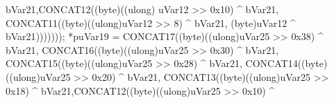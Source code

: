 \documentclass[
]{article}
\newenvironment{Shaded}{}{}
\newcommand{\BaseNTok}[1]{\textcolor[rgb]{0.25,0.63,0.44}{#1}}
\newcommand{\DecValTok}[1]{\textcolor[rgb]{0.25,0.63,0.44}{#1}}
\newcommand{\ExtensionTok}[1]{#1}
\newcommand{\NormalTok}[1]{#1}
\newcommand{\OperatorTok}[1]{\textcolor[rgb]{0.40,0.40,0.40}{#1}}
\begin{document}
\begin{Shaded}
\begin{Highlighting}[]
\NormalTok{                                                                  bVar21}\OperatorTok{,}\NormalTok{CONCAT12}\OperatorTok{((}\NormalTok{byte}\OperatorTok{)((}\ExtensionTok{ulong}\OperatorTok{)}
\NormalTok{                                                  uVar12 }\OperatorTok{\textgreater{}\textgreater{}} \BaseNTok{0x10}\OperatorTok{)} \OperatorTok{\^{}}\NormalTok{ bVar21}\OperatorTok{,}
\NormalTok{                                                  CONCAT11}\OperatorTok{((}\NormalTok{byte}\OperatorTok{)((}\ExtensionTok{ulong}\OperatorTok{)}\NormalTok{uVar12 }\OperatorTok{\textgreater{}\textgreater{}} \DecValTok{8}\OperatorTok{)} \OperatorTok{\^{}}\NormalTok{ bVar21}\OperatorTok{,}
                                                           \OperatorTok{(}\NormalTok{byte}\OperatorTok{)}\NormalTok{uVar12 }\OperatorTok{\^{}}\NormalTok{ bVar21}\OperatorTok{)))))));}
        \OperatorTok{*}\NormalTok{puVar19 }\OperatorTok{=}\NormalTok{ CONCAT17}\OperatorTok{((}\NormalTok{byte}\OperatorTok{)((}\ExtensionTok{ulong}\OperatorTok{)}\NormalTok{uVar25 }\OperatorTok{\textgreater{}\textgreater{}} \BaseNTok{0x38}\OperatorTok{)} \OperatorTok{\^{}}\NormalTok{ bVar21}\OperatorTok{,}
\NormalTok{                            CONCAT16}\OperatorTok{((}\NormalTok{byte}\OperatorTok{)((}\ExtensionTok{ulong}\OperatorTok{)}\NormalTok{uVar25 }\OperatorTok{\textgreater{}\textgreater{}} \BaseNTok{0x30}\OperatorTok{)} \OperatorTok{\^{}}\NormalTok{ bVar21}\OperatorTok{,}
\NormalTok{                                     CONCAT15}\OperatorTok{((}\NormalTok{byte}\OperatorTok{)((}\ExtensionTok{ulong}\OperatorTok{)}\NormalTok{uVar25 }\OperatorTok{\textgreater{}\textgreater{}} \BaseNTok{0x28}\OperatorTok{)} \OperatorTok{\^{}}\NormalTok{ bVar21}\OperatorTok{,}
\NormalTok{                                              CONCAT14}\OperatorTok{((}\NormalTok{byte}\OperatorTok{)((}\ExtensionTok{ulong}\OperatorTok{)}\NormalTok{uVar25 }\OperatorTok{\textgreater{}\textgreater{}} \BaseNTok{0x20}\OperatorTok{)} \OperatorTok{\^{}}\NormalTok{ bVar21}\OperatorTok{,}
\NormalTok{                                                       CONCAT13}\OperatorTok{((}\NormalTok{byte}\OperatorTok{)((}\ExtensionTok{ulong}\OperatorTok{)}\NormalTok{uVar25 }\OperatorTok{\textgreater{}\textgreater{}} \BaseNTok{0x18}\OperatorTok{)} \OperatorTok{\^{}}
\NormalTok{                                                                bVar21}\OperatorTok{,}\NormalTok{CONCAT12}\OperatorTok{((}\NormalTok{byte}\OperatorTok{)((}\ExtensionTok{ulong}\OperatorTok{)}\NormalTok{uVar25}
                                                                                      \OperatorTok{\textgreater{}\textgreater{}} \BaseNTok{0x10}\OperatorTok{)} \OperatorTok{\^{}}

\end{Highlighting}
\end{Shaded}
\end{document}
